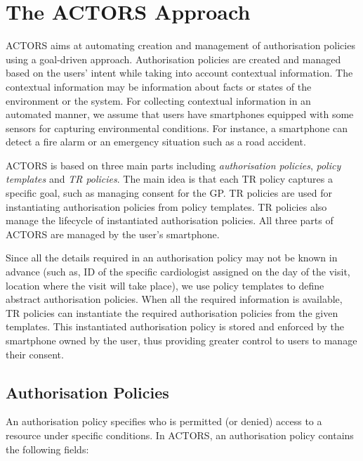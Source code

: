 \documentclass[10pt, conference, compsocconf]{IEEEtran}
\begin{document}
\section{The ACTORS Approach}
\label{sec:proposed_approach}

ACTORS aims at automating creation and management of authorisation policies using a goal-driven approach. Authorisation policies are created and managed based on the users' intent while taking into account contextual information. The contextual information may be information about facts or states of the environment or the system. For collecting contextual information in an automated manner, we assume that users have smartphones equipped with some sensors for capturing environmental conditions. For instance, a smartphone can detect a fire alarm or an emergency situation such as a road accident.

ACTORS is based on three main parts including \emph{authorisation policies}, \emph{policy templates} and \emph{TR policies}. The main idea is that each TR policy captures a specific goal, such as managing consent for the GP. TR policies are used for instantiating authorisation policies from policy templates. TR policies also manage the lifecycle of instantiated authorisation policies. All three parts of ACTORS are managed by the user's smartphone.

Since all the details required in an authorisation policy may not be known in advance (such as, ID of the specific cardiologist assigned on the day of the visit, location where the visit will take place), we use policy templates to define abstract authorisation policies. When all the required information is available, TR policies can instantiate the required authorisation policies from the given templates. This instantiated authorisation policy is stored and enforced by the smartphone owned by the user, thus providing greater control to users to manage their consent.

\subsection{Authorisation Policies}
An authorisation policy specifies who is permitted (or denied) access to a resource under specific conditions. In ACTORS, an authorisation policy contains the following fields:
\end{document}
